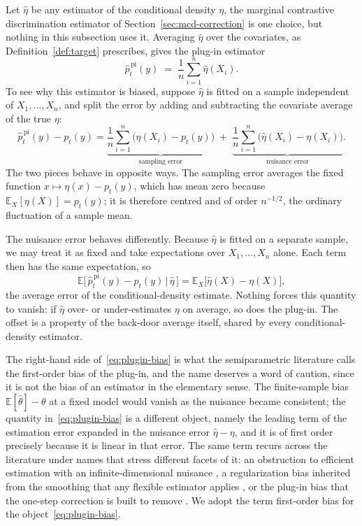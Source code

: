 \documentclass[11pt]{article}
\theoremstyle{plain}
\theoremstyle{definition}
\theoremstyle{remark}
\newcommand{\pE}{\ensuremath{\mathbb{E}}}
\begin{document}
Let $\widehat\eta$ be any estimator of the conditional density $\eta$, the marginal
contrastive discrimination estimator of Section~\ref{sec:mcd-correction} is one choice, but
nothing in this subsection uses it. Averaging
$\widehat\eta$ over the covariates, as Definition~\ref{def:target} prescribes, gives the
plug-in estimator
\begin{equation}
\widehat p^{\,\mathrm{pi}}_t(y)
\;=\; \frac{1}{n} \sum_{i=1}^{n} \widehat\eta(X_i).
\label{eq:plugin}
\end{equation}
To see why this estimator is biased, suppose $\widehat\eta$ is fitted on a sample independent
of $X_1,\dots,X_n$, and split the error by adding and subtracting the covariate average of the
true $\eta$:
\begin{equation}
\widehat p^{\,\mathrm{pi}}_t(y) - p_t(y)
= \underbrace{\frac1n \sum_{i=1}^n \big( \eta(X_i) - p_t(y) \big)}_{\text{sampling error}}
\;+\; \underbrace{\frac1n \sum_{i=1}^n \big( \widehat\eta(X_i) - \eta(X_i) \big)}_{\text{nuisance error}} .
\label{eq:plugin-decomp}
\end{equation}
The two pieces behave in opposite ways. The sampling error averages the fixed function
$x\mapsto\eta(x)-p_t(y)$, which has mean zero because $\pE_X[\eta(X)] = p_t(y)$; it is
therefore centred and of order $n^{-1/2}$, the ordinary fluctuation of a sample mean.

The nuisance error behaves differently. Because
$\widehat\eta$ is fitted on a separate sample, we may treat it as fixed and take expectations
over $X_1,\dots,X_n$ alone. Each term then has the same expectation, so
\begin{equation}
\pE\Big[\, \widehat p^{\,\mathrm{pi}}_t(y) - p_t(y) \,\Big|\, \widehat\eta \,\Big]
= \pE_X\big[ \widehat\eta(X) - \eta(X) \big],
\label{eq:plugin-bias}
\end{equation}
the average error of the conditional-density estimate. Nothing forces this quantity to vanish:
if $\widehat\eta$ over- or under-estimates $\eta$ on average, so does the plug-in. The offset
is a property of the back-door average itself, shared by every conditional-density estimator.

The right-hand side of~\eqref{eq:plugin-bias} is what the semiparametric literature calls the
first-order bias of the plug-in, and the name deserves a word of caution, since it is not the
bias of an estimator in the elementary sense. The finite-sample bias
$\pE[\widehat\theta]-\theta$ at a fixed model would vanish as the nuisance became consistent;
the quantity in~\eqref{eq:plugin-bias} is a different object, namely the leading term of the
estimation error expanded in the nuisance error $\widehat\eta-\eta$, and it is of first order
precisely because it is linear in that error. The same term recurs across the literature under
names that stress different facets of it: an obstruction to efficient estimation with an
infinite-dimensional nuisance \citep{bickel1988,robins2008}, a regularization bias inherited
from the smoothing that any flexible estimator applies \citep{chernozhukov2018}, or the plug-in
bias that the one-step correction is built to remove
\citep{vanderlaan2006tmle,kennedy2022review}. We adopt the term first-order bias for the
object~\eqref{eq:plugin-bias}.
\end{document}
